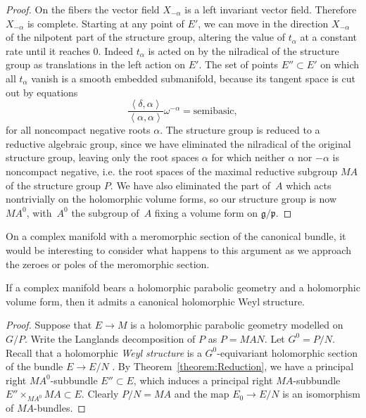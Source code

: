 \documentclass[pdftex]{sigma}
\begin{document}
\begin{proof}
On the f\/ibers the vector f\/ield $X_{-\alpha}$ is a left invariant vector f\/ield.
Therefore $X_{-\alpha}$ is complete. Starting at any point of $E'$,
we can move in the direction $X_{-\alpha}$ of the nilpotent part
of the structure group, altering the value of $t_{\alpha}$ at a constant rate
until it reaches $0$. Indeed $t_{\alpha}$ is acted on by the nilradical
of the structure group as translations in the left action on $E'$. The set of points
$E'' \subset E'$ on which all $t_{\alpha}$ vanish is a smooth embedded
submanifold, because its tangent space is cut out by equations
\[
\frac{\left<\delta,\alpha\right>}{\left<\alpha,\alpha\right>} \omega^{-\alpha} = \text{semibasic},
\]
for all noncompact negative roots $\alpha.$ The structure group is
reduced to
a reductive algebraic group, since we have eliminated the nilradical
of the original structure group, leaving only the root spaces
$\alpha$ for which neither $\alpha$ nor $-\alpha$ is
noncompact negative, i.e.
the root spaces of the maximal reductive subgroup $MA$
of the structure group $P$. We have also eliminated the
part of~$A$ which acts nontrivially on the holomorphic
volume forms, so our structure group is now~$MA^0$,
with~$A^0$ the subgroup of~$A$ f\/ixing a volume form on
$\mathfrak{g}/\mathfrak{p}$.
\end{proof}

\begin{remark}
On a complex manifold with a meromorphic section of the canonical
bundle, it would be interesting to consider what happens to this
argument as we approach the zeroes or poles of the meromorphic
section.
\end{remark}

\begin{corollary}\label{corollary:Weyl}
If a complex manifold bears a holomorphic parabolic geometry
and a holomorphic volume form, then it admits a canonical
holomorphic Weyl structure.
\end{corollary}
\begin{proof}
Suppose that $E \to M$ is a holomorphic parabolic
geometry modelled on $G/P$. Write the Langlands
decomposition of $P$ as $P=MAN$.
Let $G^0=P/N$.
Recall that a holomorphic \emph{Weyl structure} is a
$G^0$-equivariant holomorphic section of the bundle
$E \to E/N$ \cite{Cap/Slovak:2009}. By Theorem~\ref{theorem:Reduction},
we have a principal right $MA^0$-subbundle $E'' \subset E$,
which induces a principal right $MA$-subbundle
$E'' \times_{MA^0} MA \subset E$.
Clearly $P/N=MA$ and the map $E_0 \to E/N$ is an
isomorphism of $MA$-bundles.
\end{proof}
\end{document}
